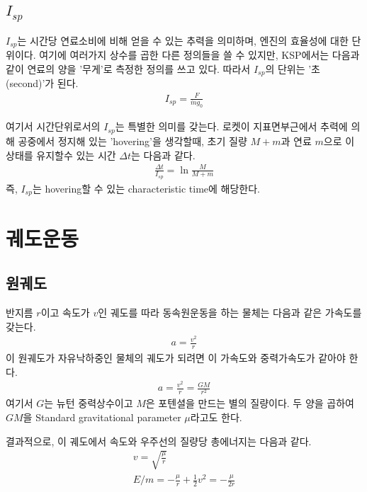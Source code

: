 \documentclass[9pt,twoside,openany]{amsbook}
\begin{document}
\section{$I_{sp}$}
$I_{sp}$는 시간당 연료소비에 비해 얻을 수 있는 추력을 의미하며, 엔진의 효율성에 대한 단위이다.
여기에 여러가지 상수를 곱한 다른 정의들을 쓸 수 있지만, KSP에서는 다음과 같이 연료의 양을 '무게'로 측정한 정의를 쓰고 있다. 따라서 $I_{sp}$의 단위는 '초(second)'가 된다.
\begin{align}
I_{sp} = \frac{F}{\dot{m}g_0}
\end{align}

여기서 시간단위로서의 $I_{sp}$는 특별한 의미를 갖는다. 
로켓이 지표면부근에서 추력에 의해 공중에서 정지해 있는 'hovering'을 생각할때, 
초기 질량 $M+m$과 연료 $m$으로 이 상태를 유지할수 있는 시간 $\Delta t$는 다음과 같다.
\begin{align}
\frac{\Delta t}{I_{sp}} = \ln\frac{M}{M+m}
\end{align}
즉, $I_{sp}$는 hovering할 수 있는 characteristic time에 해당한다.


\chapter{궤도운동}
\section{원궤도}
반지름 $r$이고 속도가 $v$인 궤도를 따라 동속원운동을 하는 물체는 다음과 같은 가속도를 갖는다.
\begin{align}
 a = \frac{v^2}{r}
\end{align}
이 원궤도가 자유낙하중인 물체의 궤도가 되려면 이 가속도와 중력가속도가 같아야 한다.
\begin{align}
 a = \frac{v^2}{r} = \frac{GM}{r^2}
\end{align}
여기서 $G$는 뉴턴 중력상수이고 $M$은 포텐셜을 만드는 별의 질량이다. 두 양을 곱하여 $GM$을 Standard gravitational parameter $\mu$라고도 한다.

결과적으로, 이 궤도에서 속도와 우주선의 질량당 총에너지는 다음과 같다.
\begin{align}
v= \sqrt{\frac{\mu}{r}}
\\
E/m = -\frac{\mu}{r} +\frac{1}{2}v^2 = -\frac{\mu}{2r}
\end{align}
\end{document}
